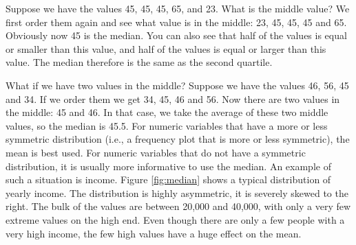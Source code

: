 Suppose we have the values 45, 45, 45, 65, and 23. What is the middle value? We first order them again and see what value is in the middle: 23, 45, 45, 45 and 65. Obviously now 45 is the median. You can also see that half of the values is equal or smaller than this value, and half of the values is equal or larger than this value. The median therefore is the same as the second quartile.

What if we have two values in the middle? Suppose we have the values 46, 56, 45 and 34. If we order them we get 34, 45, 46 and 56. Now there are two values in the middle: 45 and 46. In that case, we take the average of these two middle values, so the median is 45.5. For numeric variables that have a more or less symmetric distribution (i.e., a frequency plot that is more or less symmetric), the mean is best used. For numeric variables that do not have a symmetric distribution, it is usually more informative to use the median. An example of such a situation is income. Figure \ref{fig:median} shows a typical distribution of yearly income. The distribution is highly asymmetric, it is severely skewed to the right. The bulk of the values are between 20,000 and 40,000, with only a very few extreme values on the high end. Even though there are only a few people with a very high income, the few high values have a huge effect on the mean.

\begin{kframe}


{\ttfamily\noindent\bfseries{}}

{\ttfamily\noindent\bfseries{}}\end{kframe}















































